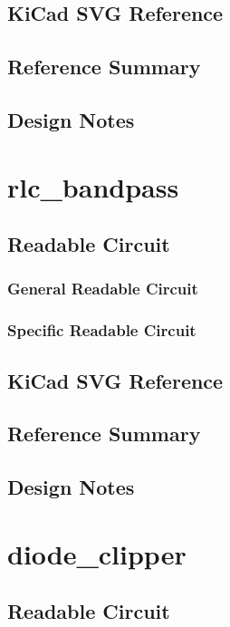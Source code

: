 \documentclass[11pt]{article}
\begin{document}
\subsection{KiCad SVG Reference}
\subsection{Reference Summary}

\subsection{Design Notes}

\clearpage
\section{rlc\_bandpass}
\subsection{Readable Circuit}
\subsubsection{General Readable Circuit}

\subsubsection{Specific Readable Circuit}

\subsection{KiCad SVG Reference}
\subsection{Reference Summary}

\subsection{Design Notes}

\clearpage
\section{diode\_clipper}
\subsection{Readable Circuit}
\end{document}
